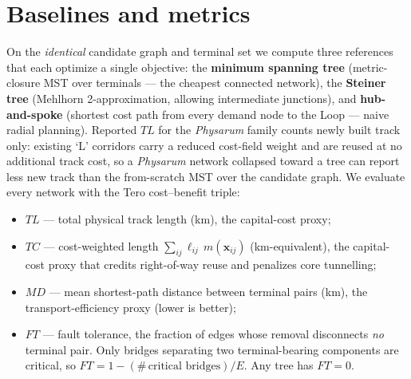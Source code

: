 \documentclass[11pt]{article}
\begin{document}
\section{Baselines and metrics}
On the \emph{identical} candidate graph and terminal set we compute three references that
each optimize a single objective: the \textbf{minimum spanning tree} (metric-closure MST
over terminals --- the cheapest connected network), the \textbf{Steiner tree}
(Mehlhorn 2-approximation, allowing intermediate junctions), and \textbf{hub-and-spoke}
(shortest cost path from every demand node to the Loop --- naive radial planning).
Reported $TL$ for the \emph{Physarum} family counts newly built track only: existing `L'
corridors carry a reduced cost-field weight and are reused at no additional track cost, so a
\emph{Physarum} network collapsed toward a tree can report less new track than the
from-scratch MST over the candidate graph. We
evaluate every network with the Tero cost--benefit triple:
\begin{itemize}
\item $TL$ --- total physical track length (km), the capital-cost proxy;
\item $TC$ --- cost-weighted length $\sum_{ij}\ell_{ij}\,m(\mathbf{x}_{ij})$ (km-equivalent),
the capital-cost proxy that credits right-of-way reuse and penalizes core tunnelling;
\item $MD$ --- mean shortest-path distance between terminal pairs (km), the transport-efficiency
proxy (lower is better);
\item $FT$ --- fault tolerance, the fraction of edges whose removal disconnects \emph{no}
terminal pair. Only bridges separating two terminal-bearing components are critical, so
$FT = 1 - (\#\,\text{critical bridges})/E$. Any tree has $FT=0$.
\end{itemize}
\end{document}
